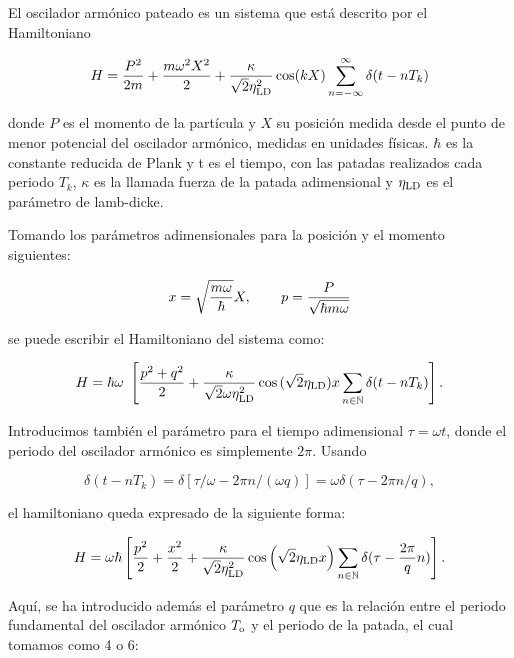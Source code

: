 \documentclass[letterpaper,12pt,oneside]{book}
\begin{document}
	El oscilador arm\'onico pateado es un sistema que est\'a descrito por el Hamiltoniano
	
	\begin{equation}
		H = \frac{P^2}{2m} + \frac{m\omega^2X^2}{2} + \frac{\kappa}{\sqrt{2}\eta_{\rm LD}^2}\cos(kX)\sum_{n=-\infty}^{\infty}\delta(t-nT_k)
	\end{equation}
	
	\noindent donde $P$ es el momento de la part\'icula y $X$ su posici\'on medida desde el punto de menor potencial del oscilador arm\'onico, medidas en unidades f\'isicas. $\hbar$ es la constante reducida de Plank y t es el tiempo, con las patadas realizados cada periodo $T_k$, $\kappa$ es la llamada fuerza de la patada adimensional y $\eta_{\rm LD}$ es el par\'ametro de lamb-dicke.
	
	 Tomando los par\'ametros adimensionales para la posici\'on y el momento siguientes:
	
	\begin{equation}\label{CambioVariables}
		x = \sqrt{\frac{m\omega}{\hbar}}X, \verb|    | p = \frac{P}{\sqrt{\hbar m \omega}}
	\end{equation}
	
	\noindent se puede escribir el Hamiltoniano del sistema como:
	
	\begin{equation}
	H = \hbar\omega\ \left[ \frac{p^2+q^2}{2} + \frac{\kappa}{\sqrt{2}\omega\eta_{\rm LD}^2}\cos{(\sqrt{2}\eta_{\rm LD})x}\sum_{n\in\mathbb{N}}\delta(t-nT_k) \right].
	\end{equation}
	
	Introducimos tambi\'en el par\'ametro para el tiempo adimensional $\tau=\omega t$, donde el periodo del oscilador arm\'onico es simplemente $2\pi$. Usando 
	
	\begin{equation}
		\delta(t-nT_k) = \delta[\tau/\omega - 2\pi n/(\omega q)] = \omega\delta(\tau-2\pi n/q),
	\end{equation}
	
	el hamiltoniano queda expresado de la siguiente forma:
	
	
	\begin{equation}\label{Hamiltoniano}
	H = \omega \hbar \left[ \frac{p^2}{2} + \frac{x^2}{2} + \frac{\kappa}{\sqrt{2}\eta_{\rm LD}^2} \cos \left( \sqrt{2}\eta_{\rm LD} x  \right) \sum_{n\in\mathbb{N}}\delta(\tau - \frac{2\pi}{q}n) \right].
	\end{equation}
	
	Aqu\'i, se ha introducido adem\'as el par\'ametro $q$ que es la relaci\'on entre el periodo fundamental del oscilador arm\'onico $T_{\rm o}$  y el periodo de la patada, el cual tomamos como 4 o 6:
	
\end{document}
